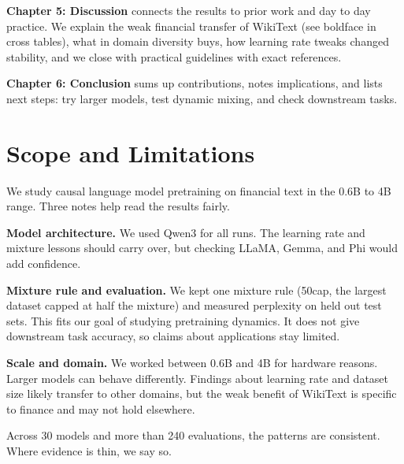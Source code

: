 \textbf{Chapter 5: Discussion} connects the results to prior work and day to day practice. We explain the weak financial transfer of WikiText (see boldface in cross tables), what in domain diversity buys, how learning rate tweaks changed stability, and we close with practical guidelines with exact references.

\textbf{Chapter 6: Conclusion} sums up contributions, notes implications, and lists next steps: try larger models, test dynamic mixing, and check downstream tasks.

\section{Scope and Limitations}

We study causal language model pretraining on financial text in the 0.6B to 4B range. Three notes help read the results fairly.

\textbf{Model architecture.} We used Qwen3 for all runs. The learning rate and mixture lessons should carry over, but checking LLaMA, Gemma, and Phi would add confidence.

\textbf{Mixture rule and evaluation.} We kept one mixture rule (50cap, the largest dataset capped at half the mixture) and measured perplexity on held out test sets. This fits our goal of studying pretraining dynamics. It does not give downstream task accuracy, so claims about applications stay limited.

\textbf{Scale and domain.} We worked between 0.6B and 4B for hardware reasons. Larger models can behave differently. Findings about learning rate and dataset size likely transfer to other domains, but the weak benefit of WikiText is specific to finance and may not hold elsewhere.

Across 30 models and more than 240 evaluations, the patterns are consistent. Where evidence is thin, we say so.

